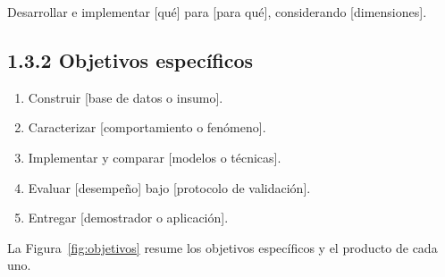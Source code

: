 \documentclass[12pt,letterpaper]{report}
\begin{document}
Desarrollar e implementar [qué] para [para qué], considerando [dimensiones].

\subsection{1.3.2 Objetivos específicos}

\begin{enumerate}[label=\textbf{OE~\arabic*.}, leftmargin=1.6cm]
    \item Construir [base de datos o insumo].
    \item Caracterizar [comportamiento o fenómeno].
    \item Implementar y comparar [modelos o técnicas].
    \item Evaluar [desempeño] bajo [protocolo de validación].
    \item Entregar [demostrador o aplicación].
\end{enumerate}

La Figura~\ref{fig:objetivos} resume los objetivos específicos y el producto de cada uno.
\end{document}

